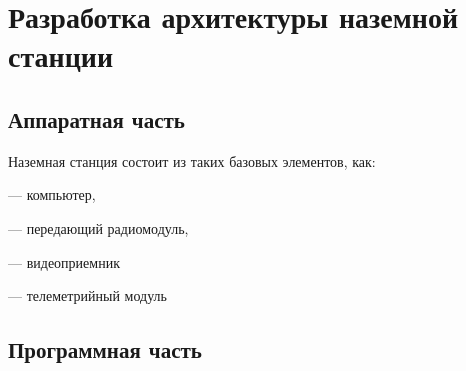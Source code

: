 
\section{Разработка архитектуры наземной станции}
\subsection{Аппаратная часть}
Наземная станция состоит из таких базовых элементов, как:

--- компьютер,

--- передающий радиомодуль,

--- видеоприемник

--- телеметрийный модуль

\subsection{Программная часть}
